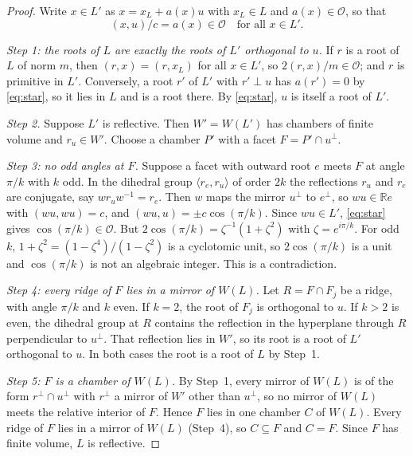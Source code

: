 \documentclass[11pt]{amsart}
\theoremstyle{definition}
\newcommand{\R}{\mathbb{R}}
\newcommand{\OK}{\mathcal{O}}
\begin{document}
\begin{proof}
Write $x\in L'$ as $x=x_L+a(x)u$ with $x_L\in L$ and $a(x)\in\OK$, so that
\begin{equation}\label{eq:star}
  (x,u)/c=a(x)\in\OK\quad\text{for all }x\in L'.
\end{equation}

\emph{Step 1: the roots of $L$ are exactly the roots of $L'$ orthogonal to $u$.} If $r$ is a
root of $L$ of norm $m$, then $(r,x)=(r,x_L)$ for all $x\in L'$, so $2(r,x)/m\in\OK$; and $r$
is primitive in $L'$. Conversely, a root $r'$ of $L'$ with $r'\perp u$ has $a(r')=0$ by
\eqref{eq:star}, so it lies in $L$ and is a root there. By \eqref{eq:star}, $u$ is itself a
root of $L'$.

\emph{Step 2.} Suppose $L'$ is reflective. Then $W'=W(L')$ has chambers of finite volume and
$r_u\in W'$. Choose a chamber $P'$ with a facet $F=P'\cap u^\perp$.

\emph{Step 3: no odd angles at $F$.} Suppose a facet with outward root $e$ meets $F$ at angle
$\pi/k$ with $k$ odd. In the dihedral group $\langle r_e,r_u\rangle$ of order $2k$ the
reflections $r_u$ and $r_e$ are conjugate, say $w r_u w^{-1}=r_e$. Then $w$ maps the mirror
$u^\perp$ to $e^\perp$, so $wu\in\R e$ with $(wu,wu)=c$, and $(wu,u)=\pm c\cos(\pi/k)$. Since
$wu\in L'$, \eqref{eq:star} gives $\cos(\pi/k)\in\OK$. But
$2\cos(\pi/k)=\zeta^{-1}(1+\zeta^2)$ with $\zeta=e^{i\pi/k}$. For odd $k$,
$1+\zeta^2=(1-\zeta^4)/(1-\zeta^2)$ is a cyclotomic unit, so $2\cos(\pi/k)$ is a unit and
$\cos(\pi/k)$ is not an algebraic integer. This is a contradiction.

\emph{Step 4: every ridge of $F$ lies in a mirror of $W(L)$.} Let $R=F\cap F_j$ be a ridge,
with angle $\pi/k$ and $k$ even. If $k=2$, the root of $F_j$ is orthogonal to $u$. If $k>2$ is
even, the dihedral group at $R$ contains the reflection in the hyperplane through $R$
perpendicular to $u^\perp$. That reflection lies in $W'$, so its root is a root of $L'$
orthogonal to $u$. In both cases the root is a root of $L$ by Step~1.

\emph{Step 5: $F$ is a chamber of $W(L)$.} By Step~1, every mirror of $W(L)$ is of the form
$r^\perp\cap u^\perp$ with $r^\perp$ a mirror of $W'$ other than $u^\perp$, so no mirror of
$W(L)$ meets the relative interior of $F$. Hence $F$ lies in one chamber $C$ of $W(L)$. Every
ridge of $F$ lies in a mirror of $W(L)$ (Step~4), so $C\subseteq F$ and $C=F$. Since $F$ has
finite volume, $L$ is reflective.
\end{proof}
\end{document}
